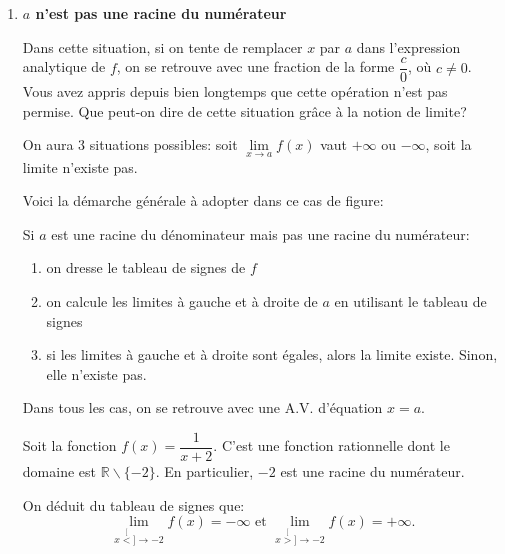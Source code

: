 \documentclass[a4paper,12pt]{report}
\newcommand{\IR}{\mathbb{R}}
\newcommand{\tog}{\stackrel[<]{}{\to}}
\newcommand{\tod}{\stackrel[>]{}{\to}}
\newcommand{\pinf}{+\infty}
\newcommand{\minf}{-\infty}
\begin{document}
\begin{enumerate}
\item \textbf{\(a\) n'est pas une racine du numérateur}
\label{sec:org7b66e57}

Dans cette situation, si on tente de remplacer \(x\) par \(a\) dans
l'expression analytique de \(f\), on se retrouve avec une fraction de la
forme \(\dfrac{c}{0}\), où \(c\neq 0\). Vous avez appris depuis bien
longtemps que cette opération n'est pas permise. Que peut-on dire de
cette situation grâce à la notion de limite?

On aura 3 situations possibles: soit \(\lim\limits_{x\to a}f(x)\) vaut
\(\pinf\) ou \(\minf\), soit la limite n'existe pas.

Voici la démarche générale à adopter dans ce cas de figure:
\begin{methode}
Si \(a\) est une racine du dénominateur mais pas une racine du
numérateur:
\begin{enumerate}
\item on dresse le tableau de signes de \(f\)
\item on calcule les limites à gauche et à droite de \(a\) en utilisant le
tableau de signes
\item si les limites à gauche et à droite sont égales, alors la limite
existe. Sinon, elle n'existe pas.
\end{enumerate}

Dans tous les cas, on se retrouve avec une A.V. d'équation \(x=a\).
\label{org6f5374f}
\end{methode}

\begin{exemple}


Soit la fonction \(f(x)=\dfrac{1}{x+2}\). C'est une fonction rationnelle dont le
domaine est \(\IR\backslash\{-2\}\). En particulier, \(-2\) est une racine du
numérateur.
\par \setlength{\columnseprule}{0 pt}
          \begin{minipage}[t]{\linewidth}
          \begin{multicols}{2}
\begin{center}

\end{center}

On déduit du tableau de signes que:
\[
\lim\limits_{x\tog -2}f(x)=\minf\text{ et }\lim\limits_{x\tod -2}f(x)=\pinf.
\]


\end{multicols}\end{minipage}


\end{exemple}
\end{enumerate}
\end{document}
